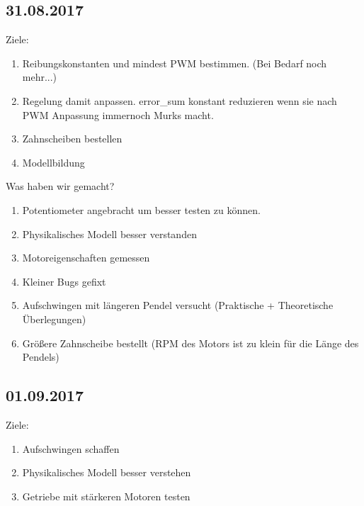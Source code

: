 \documentclass[fontsize=12pt,a4paper,parskip]{scrartcl}
\begin{document}
\subsection*{31.08.2017}

Ziele:
\begin{enumerate}
        \item Reibungskonstanten und mindest PWM bestimmen. (Bei Bedarf noch mehr...)
        \item Regelung damit anpassen. error\_sum konstant reduzieren wenn sie nach PWM Anpassung immernoch Murks macht.
        \item Zahnscheiben bestellen
        \item Modellbildung
\end{enumerate}

Was haben wir gemacht?
\begin{enumerate}
        \item Potentiometer angebracht um besser testen zu können.
        \item Physikalisches Modell besser verstanden
        \item Motoreigenschaften gemessen
        \item Kleiner Bugs gefixt
        \item Aufschwingen mit längeren Pendel versucht (Praktische + Theoretische Überlegungen)
        \item Größere Zahnscheibe bestellt (RPM des Motors ist zu klein für die Länge des Pendels)
\end{enumerate}

\subsection*{01.09.2017}

Ziele:
\begin{enumerate}
        \item Aufschwingen schaffen
        \item Physikalisches Modell besser verstehen
        \item Getriebe mit stärkeren Motoren testen
\end{enumerate}
\end{document}
